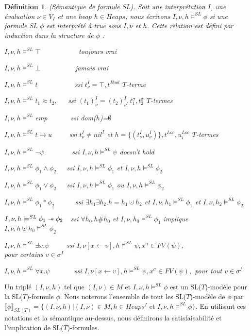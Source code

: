 \documentclass[9pt]{book}
\newcommand\sepimp{\mathrel{-\mkern-6mu*}}
\newcommand\phibra{\llbracket\phi\rrbracket}
\newtheorem{definition}{D\'efinition}[section]
\begin{document}
	\begin{definition}
	(S\'emantique de formule SL). Soit une interpr\'etation $I$, une \'evaluation $\nu\in V_{I}$ et une heap $h\in Heaps$, nous \'ecrivons $I,\nu,h\models^{SL}\phi$ si une formule SL $\phi$ est interpr\'et\'e \`a true sous $I,\nu$ et $h$. Cette relation est d\'efini par induction  dans la structure de $\phi$ :\par
	$I,\nu,h\models^{SL}\top$~~~~~~~~~~~toujours vrai\par
$I,\nu,h\models^{SL}\bot$~~~~~~~~~~jamais vrai\par
$I,\nu,h\models^{SL} t$~~~~~~~~~~ ssi $t^{I}_{\nu}=\top,t^{Bool}$ $T$-terme\par
$I,\nu,h\models^{SL} t_{1}\approx t_{2},$~~~ssi $(t_{1})^{I}_{\nu}=(t_{2})^{I}_{\nu},t^{\sigma}_{1},t^{\sigma}_{2}$ $T$-termes\par
$I,\nu,h\models^{SL}$emp ~~~~~~ssi dom($h$)=$\emptyset$\par
$I,\nu,h\models^{SL}t\mapsto u$~~~~~ssi $t^{I}_{\nu}\neq nil^{I}$ et $h = \{(t^{I}_{\nu},u^{I}_{\nu} )\}, t^{Loc}, u^{Loc}_{i}$ $T$-termes \par
$I,\nu,h\models^{SL}\neg\psi$~~~~~~~~ssi $I,\nu,h\models^{SL}\psi$ doesn't hold\par
$I,\nu,h\models^{SL}\phi_{1}\land\phi_{2}$~~~ssi $I,\nu,h\models^{SL}\phi_{1}$ et $I,\nu,h\models^{SL}\phi_{2}$\par
$I,\nu,h\models^{SL}\phi_{1}\lor\phi_{2}$~~~ssi $I,\nu,h\models^{SL}\phi_{1}$ ou $I,\nu,h\models^{SL}\phi_{2}$\par
$I,\nu,h\models^{SL}\phi_{1}*\phi_{2}$~~~~~~ssi $\exists h_{1}\exists h_{2}.h=h_{1}\cupdot h_{2}$ et $I,\nu,h_{1}\models^{SL}\phi_{1}$ et $I,\nu,h_{2}\models^{SL}\phi_{2}$\par
$I,\nu,h\models^{SL}\phi_{1}\sepimp\phi_{2}$~~ssi $\forall h_{0}.h\#h_{0}$ et $I,\nu,h_{0}\models^{SL}\phi_{1}$ implique \\$I,\nu,h\cupdot h_{0}\models^{SL}\phi_{2}$\par
$I,\nu,h\models^{SL}\exists x.\psi$~~~~~ssi $I,\nu[x\leftarrow v],h\models^{SL}\psi, x^{\sigma}\in FV(\psi),$ \\pour certains $v\in\sigma^{I}$\par
$I,\nu,h\models^{SL}\forall x.\psi$~~~~~~~ssi $I,\nu[x\leftarrow v],h\models^{SL}\psi, x^{\sigma}\in FV(\psi),$ pour tout $v\in\sigma^{I}$
	\end{definition}
	Un tripl\'e $(I,\nu,h)$ tel que $(I,\nu)\in M$ et $I,\nu,h\models^{SL}\phi$ est un SL($T$)-mod\`ele pour la SL($T$)-formule $\phi$. Nous noterons l'ensemble de tout les SL($T$)-mod\`ele de $\phi$ par $\phibra_{SL(T)} = \{(I,\nu,h)|(I,\nu)\in M,h\in Heaps^{I}$ et $I,\nu,h\models^{SL}\phi\}$. En utilisant ces notations et la s\'emantique au-dessus, nous d\'efinirons la satisfaisabilit\'e et l'implication de SL($T$)-formules.
\end{document}
